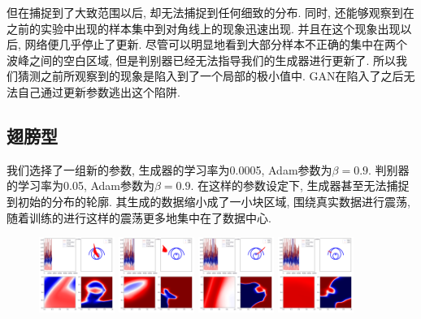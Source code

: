\documentclass[lang=cn,11pt]{elegantpaper}
\begin{document}
但在捕捉到了大致范围以后, 却无法捕捉到任何细致的分布. 同时, 还能够观察到在之前的实验中出现的样本集中到对角线上的现象迅速出现. 并且在这个现象出现以后, 网络便几乎停止了更新. 尽管可以明显地看到大部分样本不正确的集中在两个波峰之间的空白区域, 但是判别器已经无法指导我们的生成器进行更新了. 所以我们猜测之前所观察到的现象是陷入到了一个局部的极小值中. GAN在陷入了之后无法自己通过更新参数逃出这个陷阱. 

\subsection{翅膀型}

我们选择了一组新的参数, 生成器的学习率为0.0005, Adam参数为$\beta=0.9$. 判别器的学习率为0.05, Adam参数为$\beta=0.9$. 在这样的参数设定下, 生成器甚至无法捕捉到初始的分布的轮廓. 其生成的数据缩小成了一小块区域, 围绕真实数据进行震荡, 随着训练的进行这样的震荡更多地集中在了数据中心.

\begin{figure}[hbt]
\centering
  \includegraphics[width=0.22\textwidth]{wings_4_1}
  \includegraphics[width=0.22\textwidth]{wings_4_2}
  \includegraphics[width=0.22\textwidth]{wings_4_3}
  \includegraphics[width=0.22\textwidth]{wings_4_4}
\end{figure}
\end{document}

